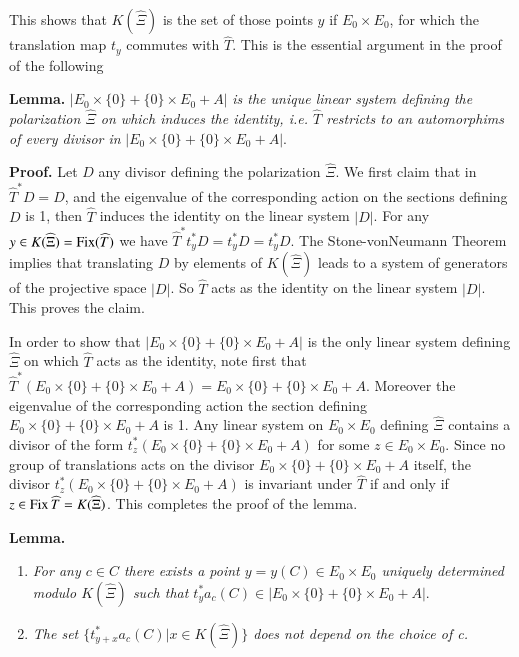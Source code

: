 This shows that $K(\widehat{\Xi})$ is the set of those points $y$ if $E_{0} \times E_{0}$, for which the translation map $t_{y}$ commutes with $\widehat{T}$.  This is the essential argument in the proof of the following

\medskip
\noindent
{\bfseries {} Lemma.\label{art11-lemma-5.6}} $|E_{0} \times \{0\} + \{0\} \times E_{0} + A|$ \textit{is the unique linear system defining the polarization $\widehat{\Xi}$ on which induces the identity, i.e. $\widehat{T}$ restricts to an automorphims of every divisor in} $|E_{0} \times \{0\} + \{0\} \times E_{0} + A|$.

\medskip
\noindent
{\bfseries Proof.} Let $D$ any divisor defining the polarization $\widehat{\Xi}$. We first claim that in $\widehat{T}^{*}D =D$, and the eigenvalue of the corresponding action on the sections defining $D$ is 1, then $\widehat{T}$ induces the identity on the linear system $|D|$. For any $y\in K (\widehat{\Xi}) =\operatorname{Fix}(\widehat{T})$ we have $\widehat{T}^{*}t_{y}^{*}D = t_{y}^{*}D=t_{y}^{*}D$. The Stone-vonNeumann Theorem implies that translating $D$ by elements of $K(\widehat{\Xi})$ leads to a system of generators of the projective space $|D|$. So $\widehat{T}$ acts as the identity on the linear system $|D|$. This proves the claim.

In order to show that $|E_{0} \times \{0\} + \{0\} \times E_{0} + A|$ is the only linear system defining $\widehat{\Xi}$ on which $\widehat{T}$ acts as the identity, note first that $\widehat{T}^{*}(E_{0} \times \{0\} + \{0\} \times E_{0} + A)=E_{0} \times \{0\} + \{0\} \times E_{0} + A$. Moreover the eigenvalue of the corresponding action the section defining $E_{0} \times \{0\} + \{0\} \times E_{0} + A$ is 1. Any linear system on $E_{0}\times E_{0}$ defining $\widehat{\Xi}$ contains a divisor of the form $t_{z}^{*}(E_{0} \times \{0\} + \{0\} \times E_{0} + A)$ for some $z \in E_{0} \times E_{0}$. Since no group of translations acts on the divisor $E_{0}\times \{0\} + \{0\} \times E_{0}+ A$ itself, the divisor $t_{z}^{*}(E_{0}\times\{0\} + \{0\} \times E_{0} + A)$ is invariant under $\widehat{T}$ if and only if $z \in \operatorname{Fix}\widehat{T}= K(\widehat{\Xi})$. This completes the proof of the lemma.

\medskip
\noindent
{\bfseries {} Lemma.\label{art11-lemma-5.7}}

\begin{enumerate}[{\it a)}]

\item \textit{For any $c \in C $ there exists a point $y =y(C) \in E_{0} \times E_{0}$ uniquely determined modulo $K(\widehat{\Xi})$ such that $t_{y}^{*}a_{c}(C) \in | E_{0} \times \{0\} +\{0\} \times E_{0} + A|$}.

\item \textit{The set $\{t_{y+x}^{*}a_{c}(C) | x \in K (\widehat{\Xi})\}$ does not depend on the choice of c.}
\end{enumerate}

